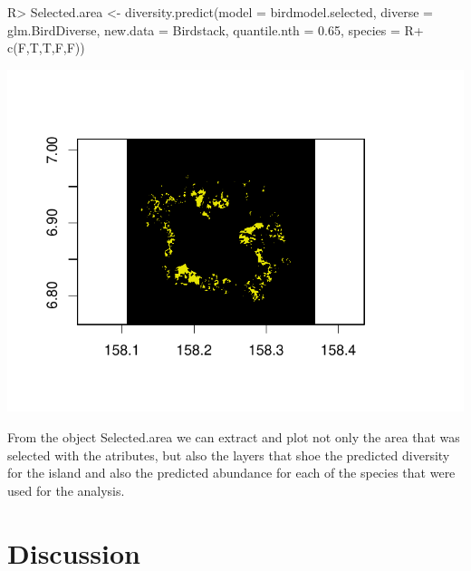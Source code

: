 \documentclass[article]{jss}
\begin{document}
\begin{CodeChunk}

\begin{CodeInput}
R> Selected.area <- diversity.predict(model = birdmodel.selected, diverse = glm.BirdDiverse, new.data = Birdstack, quantile.nth = 0.65, species =
R+ c(F,T,T,F,F))
\end{CodeInput}


\begin{center}\includegraphics{diversityocc_files/figure-latex/unnamed-chunk-28-1} \end{center}

\end{CodeChunk}

From the object Selected.area we can extract and plot not only the area
that was selected with the atributes, but also the layers that shoe the
predicted diversity for the island and also the predicted abundance for
each of the species that were used for the analysis.

\section{Discussion}\label{discussion}

\renewcommand\refname{References}

\end{document}
